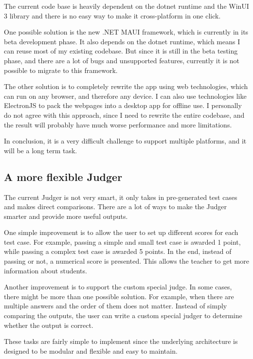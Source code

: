 \documentclass[report.tex]{subfiles}
\begin{document}
The current code base is heavily dependent on the dotnet runtime and the WinUI 3 library and there is no easy way to make it cross-platform in one click.

One possible solution is the new .NET MAUI framework\cite{microsoft:docs:what-is-maui}, which is currently in its beta development phase. It also depends on the dotnet runtime, which means I can reuse most of my existing codebase. But since it is still in the beta testing phase, and there are a lot of bugs and unsupported features, currently it is not possible to migrate to this framework.

The other solution is to completely rewrite the app using web technologies, which can run on any browser, and therefore any device. I can also use technologies like ElectronJS\cite{electron} to pack the webpages into a desktop app for offline use. I personally do not agree with this approach, since I need to rewrite the entire codebase, and the result will probably have much worse performance and more limitations.

In conclusion, it is a very difficult challenge to support multiple platforms, and it will be a long term task.

\subsection{A more flexible Judger}

The current Judger is not very smart, it only takes in pre-generated test cases and makes direct comparisons. There are a lot of ways to make the Judger smarter and provide more useful outputs.

One simple improvement is to allow the user to set up different scores for each test case. For example, passing a simple and small test case is awarded 1 point, while passing a complex test case is awarded 5 points. In the end, instead of passing or not, a numerical score is presented. This allows the teacher to get more information about students.

Another improvement is to support the custom special judge. In some cases, there might be more than one possible solution. For example, when there are multiple answers and the order of them does not matter. Instead of simply comparing the outputs, the user can write a custom special judger to determine whether the output is correct.

These tasks are fairly simple to implement since the underlying architecture is designed to be modular and flexible and easy to maintain.
\end{document}
